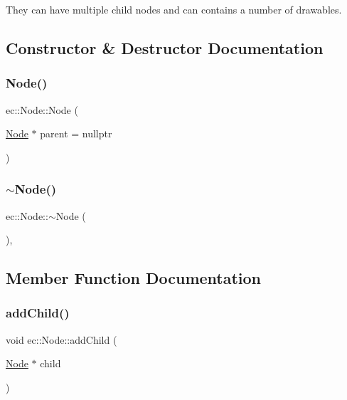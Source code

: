 They can have multiple child nodes and can contains a number of drawables. 

\subsection{Constructor \& Destructor Documentation}
\mbox{\label{classec_1_1_node_a38582758606734f5f3a0e5c6d3dc0200}} 
\subsubsection{\texorpdfstring{Node()}{Node()}}
{\footnotesize\ttfamily ec\+::\+Node\+::\+Node (\begin{DoxyParamCaption}\item[{\mbox{\hyperlink{classec_1_1_node}{Node}} $\ast$}]{parent = {\ttfamily nullptr} }\end{DoxyParamCaption})\hspace{0.3cm}{\ttfamily [explicit]}}

\mbox{\label{classec_1_1_node_a6b2dfa6d2490ec46a5d15a326780889b}} 
\subsubsection{\texorpdfstring{$\sim$\+Node()}{~Node()}}
{\footnotesize\ttfamily ec\+::\+Node\+::$\sim$\+Node (\begin{DoxyParamCaption}{ }\end{DoxyParamCaption})\hspace{0.3cm}{\ttfamily [virtual]}, {\ttfamily [default]}}



\subsection{Member Function Documentation}
\mbox{\label{classec_1_1_node_a647bcdef4e01de3ecb34e0917ba9e333}} 
\subsubsection{\texorpdfstring{add\+Child()}{addChild()}}
{\footnotesize\ttfamily void ec\+::\+Node\+::add\+Child (\begin{DoxyParamCaption}\item[{\mbox{\hyperlink{classec_1_1_node}{Node}} $\ast$}]{child }\end{DoxyParamCaption})}



